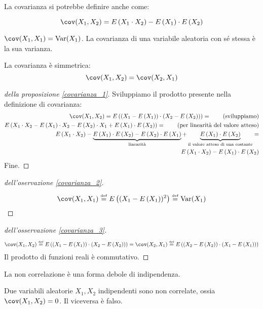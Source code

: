 La covarianza si potrebbe definire anche come:
\begin{prop}\label{covarianza_1}
\[
\cov(X_1,X_2) = \expect{X_1 \cdot X_2} - \expect{X_1} \cdot \expect{X_2}
\]
\end{prop}

\begin{oss}\label{covarianza_2}
$\cov(X_1, X_1) = \var (X_1)$. La covarianza di una variabile aleatoria con s\'e stessa \`e la sua varianza.
\end{oss}
\begin{oss}\label{covarianza_3}
La covarianza \`e simmetrica:
\[
\cov(X_1, X_2) = \cov (X_2,X_1)
\]
\end{oss}

\begin{proof}[della proposizione \ref{covarianza_1}]
Sviluppiamo il prodotto presente nella definizione di covarianza:
\begin{align*}
\cov (X_1, X_2) = \expect{ \left( X_1 - \expect{X_1} \right) \cdot \left( X_2 - \expect{X_2} \right) } =  \tag{sviluppiamo} \\
\expect{X_1 \cdot X_2 - \expect{X_1} \cdot X_2 - \expect{X_2} \cdot X_1 + \expect{X_1} \cdot \expect{X_2}} = \tag{per linearit\`a del valore atteso} \\
\expect{X_1 \cdot X_2} - \underbrace{\expect{X_1} \cdot \expect{X_2} - \expect{X_2} \cdot \expect{X_1}}_{\text{linearit\`a}} + \underbrace{\expect{X_1} \cdot \expect{X_2}}_{\text{il valore atteso di una costante}} = \\
\expect{X_1 \cdot X_2} - \expect{X_1} \cdot \expect{X_2}
\end{align*}
Fine.
\end{proof}

\begin{proof}[dell'oservazione \ref{covarianza_2}]
\[
\cov (X_1, X_1) \definition \expect{(X_1 - \expect{X_1})^2} \definition \var (X_1)
\]
\end{proof}

\begin{proof}[dell'osservazione \ref{covarianza_3}]
\[
\cov (X_1, X_2) \definition \expect{(X_1 - \expect{X_1}) \cdot (X_2 - \expect{X_2})} =
\cov (X_2, X_1) \definition \expect{(X_2 - \expect{X_2}) \cdot (X_1 - \expect{X_1})}
\]
Il prodotto di funzioni reali \`e commutativo.
\end{proof}

La non correlazione \`e una forma debole di indipendenza.
\begin{prop}
Due variabili aleatorie $X_1, X_2$ indipendenti sono non correlate, ossia $\cov (X_1, X_2) = 0$. Il viceversa \`e falso.
\end{prop}

